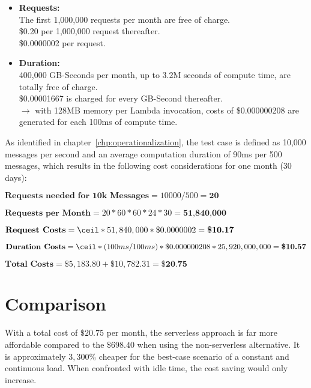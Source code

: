 \begin{itemize}[label={}]
    \item \textbf{Requests:}\\
        The first 1,000,000 requests per month are free of charge.\\
        \$0.20 per 1,000,000 request thereafter.\\
        \$0.0000002 per request.\\
    \item \textbf{Duration:}\\
        400,000 GB-Seconds per month, up to 3.2M seconds of compute time, are totally free of charge.\\
        \$0.00001667 is charged for every GB-Second thereafter.\\
        $\longrightarrow$ with 128MB memory per Lambda invocation, costs of \$0.000000208 are generated for each 100ms of compute time. 
\end{itemize}

As identified in chapter~\vref{chp:operationalization}, the test case is defined as 10,000 messages per second and an average computation duration of 90ms per 500 messages, which results in the following cost considerations for one month (30 days): 

$\textbf{Requests needed for 10k Messages} = 10000 / 500 = \textbf{20}$

$\textbf{Requests per Month} = 20 * 60 * 60 * 24 * 30 = \textbf{51,840,000}$

$\textbf{Request Costs} = \ceil*{51,840,000 * \$0.0000002} = \textbf{\$10.17}$

$\textbf{Duration Costs} = \ceil*{(100ms / 100ms) * \$0.000000208 * 25,920,000,000} = \textbf{\$10.57}$

$\textbf{Total Costs} = \$5,183.80 + \$10,782.31 = \textbf{\$20.75}$

\section{Comparison}\label{chp:viaComp}

With a total cost of $\$20.75$ per month, the serverless approach is far more affordable compared to the $\$698.40$ when using the non-serverless alternative. It is approximately $3,300\%$ cheaper for the best-case scenario of a constant and continuous load. When confronted with idle time, the cost saving would only increase.


